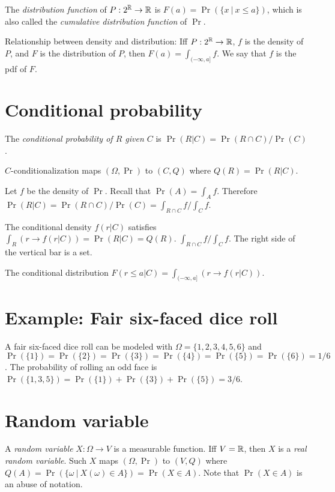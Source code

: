 %
%
The \emph{distribution function} of \(P:2^{\mathbb{R}}\to\mathbb{R}\) is \(F(a) = \Pr(\{ x~|~x \le a\})\),
which is also called the \emph{cumulative distribution function} of \(\Pr\).

Relationship between density and distribution:
Iff \(P : 2^{\mathbb{R}} \to \mathbb{R}\),
\(f\) is the density of \(P\), and
\(F\) is the distribution of \(P\),
then \(F(a) = \int_{(-\infty,a]} f\).
We say that \(f\) is the pdf of \(F\).

\section{Conditional probability}

%
%
The \emph{conditional probability of \(R\) given \(C\)}
is \(\Pr(R|C) = \Pr(R \cap C) / \Pr(C)\).

\(C\)-conditionalization maps \((\Omega,\Pr)\) to \((C,Q)\)
where \(Q(R) = \Pr(R|C)\).

Let \(f\) be the density of \(\Pr\).
Recall that \(\Pr(A) = \int_A f\).
Therefore \(\Pr(R|C) = \Pr(R \cap C)/\Pr(C) = \int_{R \cap C} f / \int_C f\).

%
%
The conditional density \(f(r|C)\) satisfies \(\int_R (r \to f(r|C)) = \Pr(R|C) = Q(R)\).
\(\int_{R \cap C} f / \int_C f\).
The right side of the vertical bar is a set.

%
%
The conditional distribution
\(F(r \le a|C) = \int_{(-\infty,a]} (r \to f(r|C))\).

\section{Example: Fair six-faced dice roll}

A fair six-faced dice roll can be modeled with
\(\Omega = \{1,2,3,4,5,6\}\) and \(\Pr(\{1\}) = \Pr(\{2\}) = \Pr(\{3\}) = \Pr(\{4\}) = \Pr(\{5\}) = \Pr(\{6\}) = 1/6\).
The probability of rolling an odd face is \(\Pr(\{1,3,5\}) = \Pr(\{1\}) + \Pr(\{3\}) + \Pr(\{5\}) = 3/6\).

\section{Random variable}

%
%
%
A \emph{random variable} \(X : \Omega \to V\)
is a measurable function.
%
%
Iff \(V = \mathbb{R}\), then \(X\) is a \emph{real random variable}.
%
Such \(X\) maps
\((\Omega,\Pr)\) to \((V,Q)\)
where \(Q(A) = \Pr(\{\omega~|~X(\omega)\in A\}) = \Pr(X\in A)\).
Note that \(\Pr(X \in A)\) is an abuse of notation.

